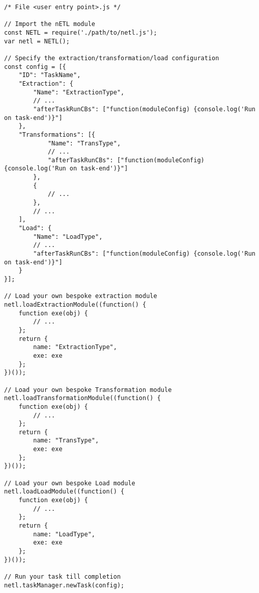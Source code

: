 \begin{verbatim}
/* File <user entry point>.js */

// Import the nETL module
const NETL = require('./path/to/netl.js');
var netl = NETL();

// Specify the extraction/transformation/load configuration
const config = [{
    "ID": "TaskName",
    "Extraction": {
        "Name": "ExtractionType",
        // ...
        "afterTaskRunCBs": ["function(moduleConfig) {console.log('Run on task-end')}"]
    },
    "Transformations": [{
            "Name": "TransType",
            // ...
            "afterTaskRunCBs": ["function(moduleConfig) {console.log('Run on task-end')}"]
        },
        {
            // ...
        },
        // ...
    ],
    "Load": {
        "Name": "LoadType",
        // ...
        "afterTaskRunCBs": ["function(moduleConfig) {console.log('Run on task-end')}"]
    }
}];

// Load your own bespoke extraction module
netl.loadExtractionModule((function() {
    function exe(obj) {
        // ...
    };
    return {
        name: "ExtractionType",
        exe: exe
    };
})());

// Load your own bespoke Transformation module
netl.loadTransformationModule((function() {
    function exe(obj) {
        // ...
    };
    return {
        name: "TransType",
        exe: exe
    };
})());

// Load your own bespoke Load module
netl.loadLoadModule((function() {
    function exe(obj) {
        // ...
    };
    return {
        name: "LoadType",
        exe: exe
    };
})());

// Run your task till completion
netl.taskManager.newTask(config);
\end{verbatim}